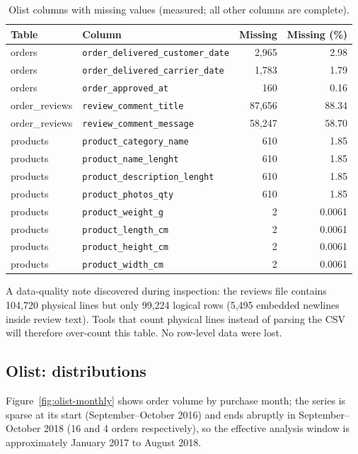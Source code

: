 \documentclass[11pt,a4paper]{article}
\newcommand{\code}[1]{\texttt{#1}}
\begin{document}
\begin{table}[H]
\centering
\small
\caption{Olist columns with missing values (measured; all other columns are complete).}
\label{tab:olist-missing}
\begin{tabular}{llrr}
\toprule
\textbf{Table} & \textbf{Column} & \textbf{Missing} & \textbf{Missing (\%)} \\
\midrule
orders & \code{order\_delivered\_customer\_date} & 2{,}965 & 2.98 \\
orders & \code{order\_delivered\_carrier\_date} & 1{,}783 & 1.79 \\
orders & \code{order\_approved\_at} & 160 & 0.16 \\
order\_reviews & \code{review\_comment\_title} & 87{,}656 & 88.34 \\
order\_reviews & \code{review\_comment\_message} & 58{,}247 & 58.70 \\
products & \code{product\_category\_name} & 610 & 1.85 \\
products & \code{product\_name\_lenght} & 610 & 1.85 \\
products & \code{product\_description\_lenght} & 610 & 1.85 \\
products & \code{product\_photos\_qty} & 610 & 1.85 \\
products & \code{product\_weight\_g} & 2 & 0.0061 \\
products & \code{product\_length\_cm} & 2 & 0.0061 \\
products & \code{product\_height\_cm} & 2 & 0.0061 \\
products & \code{product\_width\_cm} & 2 & 0.0061 \\
\bottomrule
\end{tabular}
\end{table}

A data-quality note discovered during inspection: the reviews file contains 104{,}720 physical lines but only 99{,}224 logical rows (5{,}495 embedded newlines inside review text). Tools that count physical lines instead of parsing the CSV will therefore over-count this table. No row-level data were lost.

\subsection{Olist: distributions}
Figure~\ref{fig:olist-monthly} shows order volume by purchase month; the series is sparse at its start (September--October 2016) and ends abruptly in September--October 2018 (16 and 4 orders respectively), so the effective analysis window is approximately January 2017 to August 2018.
\end{document}
